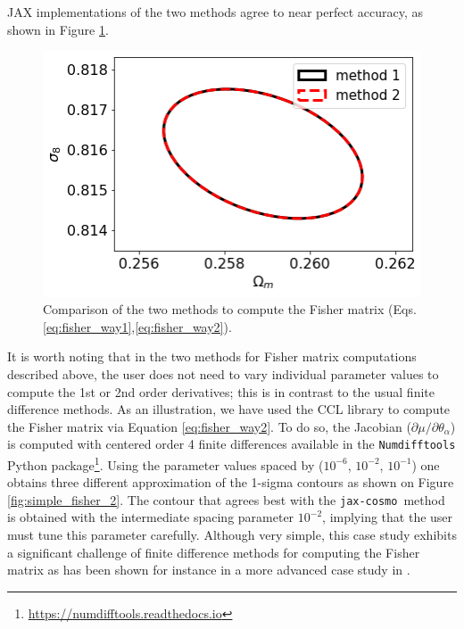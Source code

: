 \documentclass[twocolumn,twocolappendix,nofootinbib,iop]{openjournal}
\newcommand{\JZ}[1]{{\color{purple}JZ: #1}}
\newcommand{\jaxcosmo}{\texttt{jax-cosmo}}
\begin{document}
JAX implementations of the two methods agree to near perfect accuracy, as shown in Figure \ref{fig:simple_fisher_1}.
\begin{figure}
    \centering
    \includegraphics[width=0.7\columnwidth]{figures/simple_fisher_1.png}
    \caption{Comparison of the two methods to compute the Fisher matrix (Eqs.\ref{eq:fisher_way1},\ref{eq:fisher_way2}).} 
    \label{fig:simple_fisher_1}
\end{figure}
%
It is worth noting that in the two methods for Fisher matrix computations described above, the user does not need to vary individual parameter values to compute the 1st or 2nd order derivatives; this is in contrast to the usual finite difference methods. As an illustration, we have used the CCL library to compute the Fisher matrix via Equation \ref{eq:fisher_way2}. To do so, the Jacobian ($\partial \mu/\partial\theta_\alpha$) is computed with centered  order 4 finite differences available in the \texttt{Numdifftools} Python package\footnote{\url{https://numdifftools.readthedocs.io}}. Using the parameter values spaced by ($10^{-6}$, $10^{-2}$, $10^{-1}$) one obtains three different approximation of the 1-sigma contours as shown on Figure \ref{fig:simple_fisher_2}. The contour that agrees best with the \jaxcosmo\ method is obtained with the intermediate spacing parameter $10^{-2}$, implying that the user must tune this parameter carefully. Although very simple, this case study exhibits a significant challenge of finite difference methods for computing the Fisher matrix as has been shown for instance in a more advanced case study in \citet{2021arXiv210100298B}. 
\end{document}
